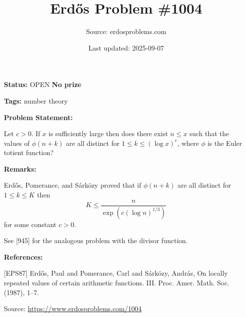 \documentclass{article}
\title{Erd\H{o}s Problem \#1004}
\date{Last updated: 2025-09-07}
\author{Source: erdosproblems.com}
\begin{document}
\maketitle

\noindent\textbf{Status:} OPEN \quad \textbf{No prize}

\noindent\textbf{Tags:} number theory

\medskip
\noindent\textbf{Problem Statement:}

Let $c>0$. If $x$ is sufficiently large then does there exist $n\leq x$ such that the values of $\phi(n+k)$ are all distinct for $1\leq k\leq (\log x)^c$, where $\phi$ is the Euler totient function?

\bigskip
\noindent\textbf{Remarks:}

Erd\H{o}s, Pomerance, and S\'{a}rk\"{o}zy \cite{EPS87} proved that if $\phi(n+k)$ are all distinct for $1\leq k\leq K$ then\[K \leq \frac{n}{\exp(c(\log n)^{1/3})}\]for some constant $c>0$. 

See [945] for the analogous problem with the divisor function.

\bigskip
\noindent\textbf{References:}

[EPS87] Erd\H{o}s, Paul and Pomerance, Carl and S\'{a}rk\"ozy, Andr\'{a}s, On locally repeated values of certain arithmetic functions.
{III}. Proc. Amer. Math. Soc. (1987), 1--7.

\bigskip
\noindent\small{Source: \url{https://www.erdosproblems.com/1004}}
\end{document}
